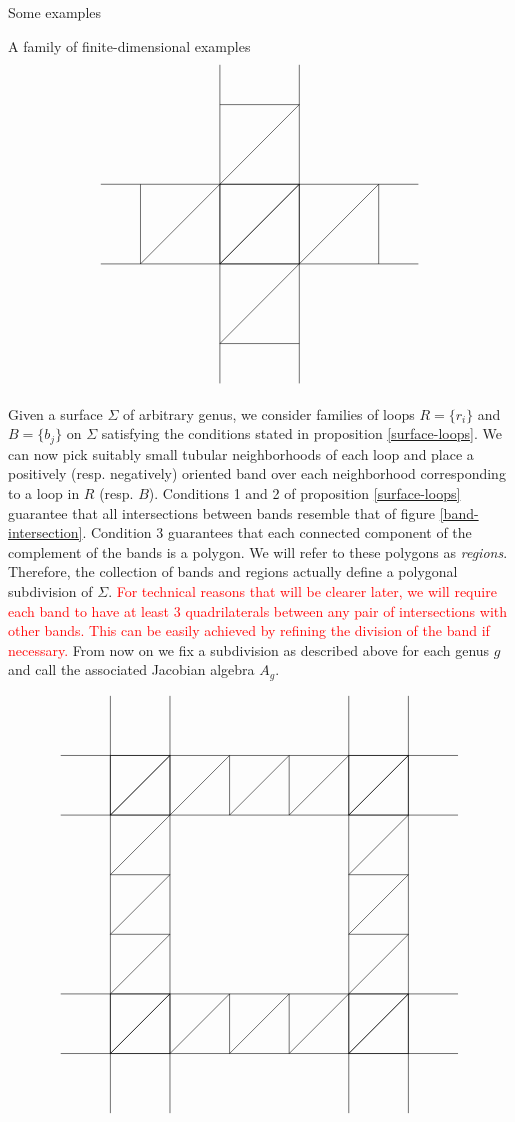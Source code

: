 \begin{chapter}{Some examples}
\begin{section}{A family of finite-dimensional examples}
\[
\label{band-intersection}
\begin{tikzpicture}
\draw (-4,-1) -- (4,-1);
\draw (-4,1) -- (4,1);
\draw (-1,4) -- (-1,-4);
\draw (1,-4) -- (1,4);
\foreach \x in {-3,-1,...,3}
{
\draw (\x,-1) -- (\x, 1);
\draw (-1,\x) -- (1,\x);
}
\foreach \x in {-3,-1,1}
{
\draw (\x,-1) -- (\x+2,1);
\draw (-1,\x) -- (1,\x+2);
}
\end{tikzpicture}
\]

Given a surface $\Sigma$ of arbitrary genus, we consider families of loops $R=\{r_i\}$ and $B=\{b_j\}$ on $\Sigma$ satisfying the conditions stated in proposition \ref{surface-loops}. We can now pick suitably small tubular neighborhoods of each loop and place a positively (resp. negatively) oriented band over each neighborhood corresponding to a loop in $R$ (resp. $B$). Conditions 1 and 2 of proposition \ref{surface-loops} guarantee that all intersections between bands resemble that of figure \ref{band-intersection}. Condition 3 guarantees that each connected component of the complement of the bands is a polygon. We will refer to these polygons as \emph{regions}. Therefore, the collection of bands and regions actually define a polygonal subdivision of $\Sigma$. \textcolor{red}{For technical reasons that will be clearer later, we will require each band to have at least 3 quadrilaterals between any pair of intersections with other bands. This can be easily achieved by refining the division of the band if necessary.} From now on we fix a subdivision as described above for each genus $g$ and call the associated Jacobian algebra $A_g$.

\begin{figure}[h]
\[
\begin{tikzpicture}
\draw (-5, .75) -- (5, .75);
\draw (-5, -.75) -- (5, -.75);
\draw (-5, -5.25) -- (5, -5.25);
\draw (-5, -6.75) -- (5, -6.75);
\draw (-2.25, -8.25) -- (-2.25, 2.25);
\draw (-3.75, -8.25) -- (-3.75, 2.25);
\draw (2.25, -8.25) -- (2.25, 2.25);
\draw (3.75, -8.25) -- (3.75, 2.25);

\foreach \x in {-3.75,-2.25,...,3.75}
{
\draw (\x, .75) -- (\x, -.75);
\draw (\x, -5.25) -- (\x, -6.75);
}

\foreach \x in {-6.75,-5.25,...,1.75}
{
\draw (-3.75, \x) -- (-2.25, \x);
\draw (3.75, \x) -- (2.25, \x);
}

\foreach \x in {-3.75,-2.25,...,2.25}
{
\draw (\x, -.75) -- (\x+1.5, .75);
\draw (\x, -6.75) -- (\x+1.5, -5.25);
}

\foreach \x in {-6.75,-5.25,...,0.25}
{
\draw (-3.75, \x) -- (-2.25, \x+1.5);
\draw (3.75, \x+1.5) -- (2.25, \x);
}


\end{tikzpicture}\]
\end{figure}
\end{section}
\end{chapter}
